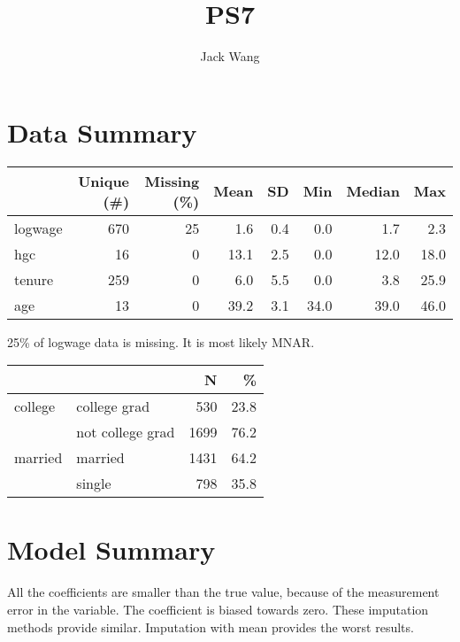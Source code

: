\documentclass{article}
\title{PS7}
\author{Jack Wang}
\begin{document}
\maketitle


\section{Data Summary}

\begin{table} [h!]
\centering
\begin{tabular}[t]{lrrrrrrr}
\toprule
  & Unique (\#) & Missing (\%) & Mean & SD & Min & Median & Max\\
\midrule
logwage & 670 & 25 & 1.6 & 0.4 & 0.0 & 1.7 & 2.3\\
hgc & 16 & 0 & 13.1 & 2.5 & 0.0 & 12.0 & 18.0\\
tenure & 259 & 0 & 6.0 & 5.5 & 0.0 & 3.8 & 25.9\\
age & 13 & 0 & 39.2 & 3.1 & 34.0 & 39.0 & 46.0\\
\bottomrule
\end{tabular}
\end{table}

 25\% of logwage data is missing. It is most likely MNAR.

\begin{table}[h!]
\centering
\begin{tabular}[t]{llrr}
\toprule
  &    & N & \%\\
\midrule
college & college grad & 530 & 23.8\\
 & not college grad & 1699 & 76.2\\
married & married & 1431 & 64.2\\
 & single & 798 & 35.8\\
\bottomrule
\end{tabular}
\end{table}

\section{Model Summary}

All the coefficients are smaller than the true value, because of the measurement error in the variable. The coefficient is biased towards zero. These imputation methods provide similar. Imputation with mean provides the worst results. 
\end{document}
